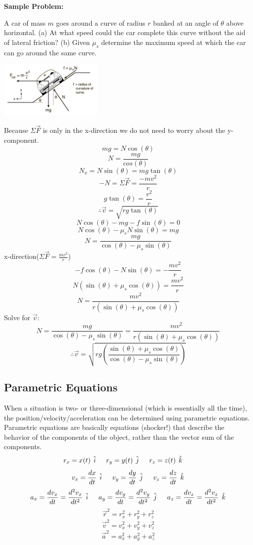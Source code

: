\documentclass{article}
\begin{document}
\textbf{Sample Problem:}
\begin{multicols}{2}
  A car of mass $m$ goes around a curve of radius $r$ banked at an angle of $\theta$ above horizontal. (a) At what speed could the car complete this curve without the aid of lateral friction? (b) Given $\mu_s$ determine the maximum speed at which the car can go around the same curve.
  \centerline{\includegraphics[width=5cm]{bankedCurve.png}}
  Because $\Sigma\vec{F}$ is only in the x-direction we do not need to worry about the y-component.
  \[
  mg=N\cos(\theta)
  \]
  \[
  N=\frac{mg}{cos(\theta)}
  \]
  \[
  N_x=N\sin(\theta)=mg\tan(\theta)
  \]
  \[
  -N=\Sigma\vec{F}=\frac{-mv^2}{r}
  \]
  \[
  g\tan(\theta)=\frac{v^2}{r}
  \]
  \[
  \therefore \vec{v}=\sqrt{rg\tan(\theta)}
  \]
  \vfill
  \columnbreak
  \[
  N\cos(\theta)-mg-f\sin(\theta)=0
  \]
  \[
  N\cos(\theta)-\mu_sN\sin(\theta)=mg
  \]
  \[
  N=\frac{mg}{\cos(\theta)-\mu_s\sin(\theta)}
  \]
  x-direction($\Sigma\vec{F}=\frac{mv^2}{r}$)
  \[
  -f\cos(\theta)-N\sin(\theta)=-\frac{mv^2}{r}
  \]
  \[
  N(\sin(\theta)+\mu_s\cos(\theta))=\frac{mv^2}{r}
  \]
  \[
  N=\frac{mv^2}{r(\sin(\theta)+\mu_s\cos(\theta))}
  \]
  Solve for $\vec{v}$:
  \[
  N=\frac{mg}{\cos(\theta)-\mu_s\sin(\theta)}=\frac{mv^2}{r(\sin(\theta)+\mu_s\cos(\theta))}
  \]
  \[
  \therefore \vec{v}=\sqrt{rg(\frac{\sin(\theta)+\mu_s\cos(\theta)}{\cos(\theta)-\mu_s\sin(\theta)})}
  \]
\end{multicols}

\subsection{Parametric Equations}
When a situation is two- or three-dimensional (which is essentially all the time), the position/velocity/acceleration can be determined using parametric equations. Parametric equations are basically equations (shocker!) that describe the behavior of the components of the object, rather than the vector sum of the components.
\[
r_x=x(t) \hspace{1ex} \hat{i} \indent
r_y=y(t) \hspace{1ex} \hat{j} \indent
r_z=z(t) \hspace{1ex} \hat{k} \indent
\]
\[
v_x=\frac{dx}{dt} \hspace{1ex} \hat{i} \indent
v_y=\frac{dy}{dt} \hspace{1ex} \hat{j} \indent
v_z=\frac{dz}{dt} \hspace{1ex} \hat{k}
\]
\[
a_x=\frac{dv_x}{dt}=\frac{d^2v_x}{dt^2} \hspace{1ex} \hat{i} \indent
a_y=\frac{dv_y}{dt}=\frac{d^2v_y}{dt^2} \hspace{1ex} \hat{j} \indent
a_z=\frac{dv_z}{dt}=\frac{d^2v_z}{dt^2} \hspace{1ex} \hat{k}
\]
\[
\vec{r}^2=r_x^2+r_y^2+r_z^2
\]
\[
\vec{v}^2=v_x^2+v_y^2+v_z^2
\]
\[
\vec{a}^2=a_x^2+a_y^2+a_z^2
\]
\end{document}
